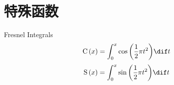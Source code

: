 \documentclass[color=green,titlestyle=hang]{elegantbook}%
\begin{document}
\chapter{特殊函数}




%

\begin{newdef}[菲涅尔积分函数]
Fresnel Integrals\[{\rm C}\left( x \right) = \int_0^x {\cos \left( {\frac{1}{2}\pi {t^2}} \right)} \dif t\]
\[{\rm S}\left( x \right) = \int_0^x {\sin \left( {\frac{1}{2}\pi {t^2}} \right)} \dif t\]
\end{newdef}
\end{document}
